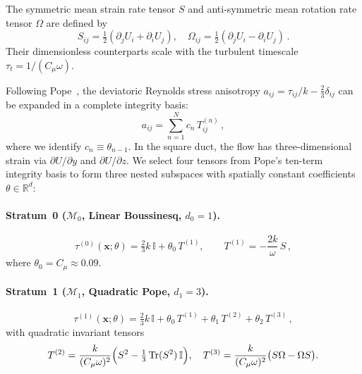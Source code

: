 \documentclass[preprint,aps,prb,longbibliography,superscriptaddress]{revtex4-2}
\newcommand{\bx}{\mathbf{x}}
\newcommand{\Tr}{\operatorname{Tr}}
\newcommand{\id}{\mathbb{I}}
\begin{document}
The symmetric mean strain rate tensor $S$ and anti-symmetric mean rotation rate
tensor $\Omega$ are defined by
\begin{equation}
  S_{ij} = \tfrac{1}{2}(\partial_j U_i + \partial_i U_j), \quad
  \Omega_{ij} = \tfrac{1}{2}(\partial_j U_i - \partial_i U_j)\,.
\end{equation}
Their dimensionless counterparts scale with the turbulent timescale
$\tau_t = 1/(C_\mu \omega)$.

Following Pope~\cite{Pope1975,Pope2000}, the deviatoric Reynolds stress anisotropy
$a_{ij} = \tau_{ij}/k - \tfrac{2}{3}\delta_{ij}$ can be expanded in a
complete integrity basis:
\begin{equation}\label{eq:pope_expansion}
  a_{ij} = \sum_{n=1}^{N} c_n\, T_{ij}^{(n)}\,,
\end{equation}
where we identify $c_n \equiv \theta_{n-1}$. In the square duct, the flow has
three-dimensional strain via $\partial U/\partial y$ and $\partial U/\partial z$.
We select four tensors from Pope's ten-term integrity basis to form three
nested subspaces with spatially constant coefficients $\theta \in \mathbb{R}^d$:

\paragraph{Stratum~0 ($\mathcal{M}_0$, Linear Boussinesq, $d_0 = 1$).}
\begin{equation}\label{eq:stratum0}
  \tau^{(0)}(\bx;\theta) = \tfrac{2}{3}k\,\id + \theta_0\, T^{(1)},
  \qquad
  T^{(1)} = -\frac{2k}{\omega}\, S\,,
\end{equation}
where $\theta_0 = C_\mu \approx 0.09$.

\paragraph{Stratum~1 ($\mathcal{M}_1$, Quadratic Pope, $d_1 = 3$).}
\begin{equation}\label{eq:stratum1}
  \tau^{(1)}(\bx;\theta) = \tfrac{2}{3}k\,\id
  + \theta_0\, T^{(1)}
  + \theta_1\, T^{(2)}
  + \theta_2\, T^{(3)}\,,
\end{equation}
with quadratic invariant tensors
\begin{equation}\label{eq:T2T3}
  T^{(2)} = \frac{k}{(C_\mu\omega)^2}
    \Bigl(S^2 - \tfrac{1}{3}\Tr(S^2)\,\id\Bigr),
  \quad
  T^{(3)} = \frac{k}{(C_\mu\omega)^2}
    \bigl(S\Omega - \Omega S\bigr).
\end{equation}
\end{document}

